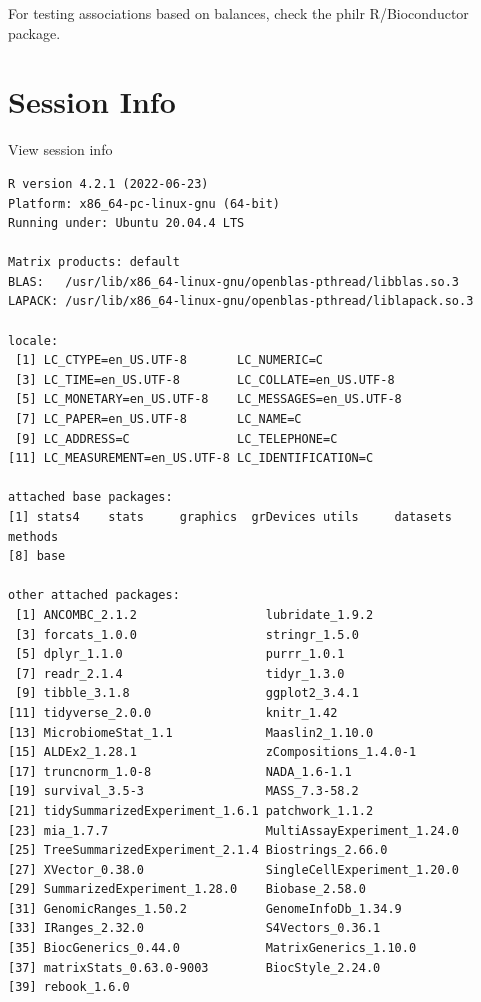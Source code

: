 \documentclass[
]{book}
\begin{document}
For testing associations based on balances, check the philr R/Bioconductor package.

\hypertarget{session-info-7}{%
\section*{Session Info}\label{session-info-7}}

View session info

\begin{verbatim}
R version 4.2.1 (2022-06-23)
Platform: x86_64-pc-linux-gnu (64-bit)
Running under: Ubuntu 20.04.4 LTS

Matrix products: default
BLAS:   /usr/lib/x86_64-linux-gnu/openblas-pthread/libblas.so.3
LAPACK: /usr/lib/x86_64-linux-gnu/openblas-pthread/liblapack.so.3

locale:
 [1] LC_CTYPE=en_US.UTF-8       LC_NUMERIC=C              
 [3] LC_TIME=en_US.UTF-8        LC_COLLATE=en_US.UTF-8    
 [5] LC_MONETARY=en_US.UTF-8    LC_MESSAGES=en_US.UTF-8   
 [7] LC_PAPER=en_US.UTF-8       LC_NAME=C                 
 [9] LC_ADDRESS=C               LC_TELEPHONE=C            
[11] LC_MEASUREMENT=en_US.UTF-8 LC_IDENTIFICATION=C       

attached base packages:
[1] stats4    stats     graphics  grDevices utils     datasets  methods  
[8] base     

other attached packages:
 [1] ANCOMBC_2.1.2                  lubridate_1.9.2               
 [3] forcats_1.0.0                  stringr_1.5.0                 
 [5] dplyr_1.1.0                    purrr_1.0.1                   
 [7] readr_2.1.4                    tidyr_1.3.0                   
 [9] tibble_3.1.8                   ggplot2_3.4.1                 
[11] tidyverse_2.0.0                knitr_1.42                    
[13] MicrobiomeStat_1.1             Maaslin2_1.10.0               
[15] ALDEx2_1.28.1                  zCompositions_1.4.0-1         
[17] truncnorm_1.0-8                NADA_1.6-1.1                  
[19] survival_3.5-3                 MASS_7.3-58.2                 
[21] tidySummarizedExperiment_1.6.1 patchwork_1.1.2               
[23] mia_1.7.7                      MultiAssayExperiment_1.24.0   
[25] TreeSummarizedExperiment_2.1.4 Biostrings_2.66.0             
[27] XVector_0.38.0                 SingleCellExperiment_1.20.0   
[29] SummarizedExperiment_1.28.0    Biobase_2.58.0                
[31] GenomicRanges_1.50.2           GenomeInfoDb_1.34.9           
[33] IRanges_2.32.0                 S4Vectors_0.36.1              
[35] BiocGenerics_0.44.0            MatrixGenerics_1.10.0         
[37] matrixStats_0.63.0-9003        BiocStyle_2.24.0              
[39] rebook_1.6.0                  


\end{verbatim}
\end{document}
